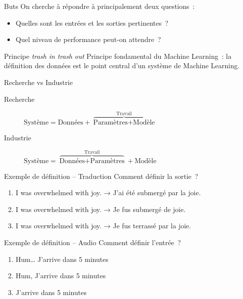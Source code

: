 \begin{frame}{Buts}
  On cherche à répondre à principalement deux questions~:
  \begin{itemize}
    \item Quelles sont les entrées et les sorties pertinentes~?
    \item Quel niveau de performance peut-on attendre~?
  \end{itemize}
\end{frame}

\begin{frame}{Principe \textit{trash in trash out}}
  Principe fondamental du Machine Learning~: la définition des données est le point \alert{central} d'un système de Machine Learning.
\end{frame}

\begin{frame}{Recherche vs Industrie}
  \begin{description}
    \item[Recherche] $\text{Système} = \text{Données} + \overbrace{\text{Paramètres} + \text{Modèle}}^{\text{Travail}}$
    \item[Industrie] $\text{Système} = \overbrace{\text{Données} + \text{Paramètres}}^{\text{Travail}} + \text{Modèle}$
  \end{description}
\end{frame}

\begin{frame}{Exemple de définition – Traduction}
  Comment définir la sortie~?
  \begin{enumerate}
    \item I was overwhelmed with joy. → J'ai été submergé par la joie.
    \item I was overwhelmed with joy. → Je fus submergé de joie.
    \item I was overwhelmed with joy. → Je fus terrassé par la joie.
  \end{enumerate}
\end{frame}

\begin{frame}{Exemple de définition – Audio}
  Comment définir l'entrée~?
  \begin{enumerate}
    \item Hum… J'arrive dans 5 minutes
    \item Hum, J'arrive dans 5 minutes
    \item J'arrive dans 5 minutes
  \end{enumerate}
\end{frame}

